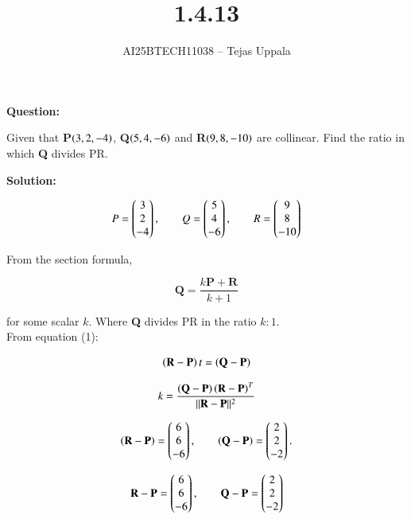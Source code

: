 \documentclass[journal,12pt,onecolumn]{IEEEtran}
\begin{document}
\title{1.4.13}
\author{AI25BTECH11038 -- Tejas Uppala}
{\let\newpage\relax\maketitle}

\textbf{Question:} 

   \noindent Given that \textbf{P}$\left(3, 2, {-4}\right)$, \textbf{Q}$\left(5, 4, {-6}\right)$ and \textbf{R}$\left(9,8,{-10}\right)$ are collinear. Find the ratio in which \textbf{Q} divides PR.

\textbf{Solution:}

\begin{equation}
P=\begin{pmatrix}3\\2\\-4\end{pmatrix},\qquad
Q=\begin{pmatrix}5\\4\\-6\end{pmatrix},\qquad
R=\begin{pmatrix}9\\8\\-10\end{pmatrix}
\end{equation}

\noindent From the section formula,

\begin{equation}
\textbf{Q} = \frac{k\textbf{P} + \textbf{R}}{k + 1} 
\end{equation}

\noindent for some scalar $k$. Where \textbf{Q} divides PR in the ratio $k : 1$. \\
\noindent From equation (1): 

\begin{equation}
 \left(\textbf{R}-\textbf{P}\right)t=\left(\textbf{Q}-\textbf{P}\right)  
\end{equation}

\begin{equation}
   k = \frac{\left(\textbf{Q}-\textbf{P}\right)\left(\textbf{R}-\textbf{P}\right)^T}{||\textbf{R}-\textbf{P}||^2}
\end{equation}

\begin{equation}
\left(\textbf{R}-\textbf{P}\right)=\begin{pmatrix}6\\6\\-6\end{pmatrix},\qquad
\left(\textbf{Q}-\textbf{P}\right)=\begin{pmatrix}2\\2\\-2\end{pmatrix}.
\end{equation}

\begin{equation}
\mathbf{R}-\mathbf{P} = \begin{pmatrix}6 \\ 6 \\ -6\end{pmatrix}, \qquad 
\mathbf{Q}-\mathbf{P} = \begin{pmatrix}2 \\ 2 \\ -2\end{pmatrix}
\end{equation}
\end{document}
